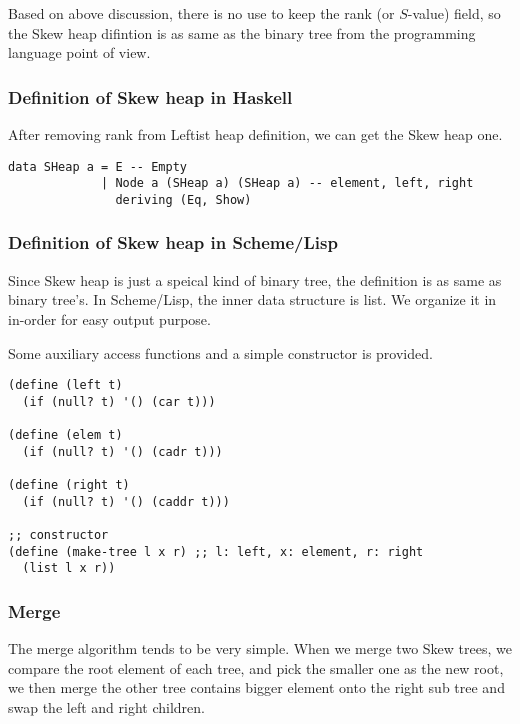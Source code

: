 \documentclass{article}
\begin{document}
Based on above discussion, there is no use to keep the rank (or $S$-value)
field, so the Skew heap difintion is as same as the binary tree from the
programming language point of view.

\subsubsection*{Definition of Skew heap in Haskell}

After removing rank from Leftist heap definition, we can get the Skew
heap one.

\lstset{language=Haskell}
\begin{lstlisting}
data SHeap a = E -- Empty 
             | Node a (SHeap a) (SHeap a) -- element, left, right
               deriving (Eq, Show)
\end{lstlisting}

\subsubsection*{Definition of Skew heap in Scheme/Lisp}
\label{skew-heap-def-lisp}

Since Skew heap is just a speical kind of binary tree, the definition is
as same as binary tree's. In Scheme/Lisp, the inner data structure is
list. We organize it in in-order for easy output purpose.

Some auxiliary access functions and a simple constructor is provided.

\lstset{language = lisp}
\begin{lstlisting}
(define (left t)
  (if (null? t) '() (car t)))

(define (elem t)
  (if (null? t) '() (cadr t)))

(define (right t)
  (if (null? t) '() (caddr t)))

;; constructor
(define (make-tree l x r) ;; l: left, x: element, r: right
  (list l x r))
\end{lstlisting}

\subsubsection{Merge}

The merge algorithm tends to be very simple. When we merge two Skew
trees, we compare the root element of each tree, and pick the smaller
one as the new root, we then merge the other tree contains bigger
element onto the right sub tree and swap the left and right children.
\end{document}
